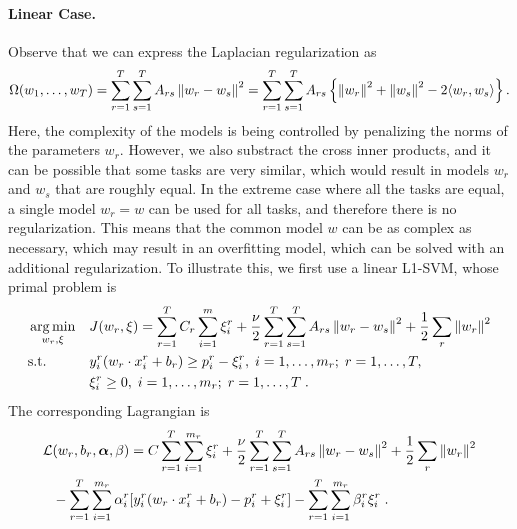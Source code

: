 \paragraph*{Linear Case.\\}
Observe that we can express the Laplacian regularization as
\begin{equation}
    \nonumber
    \Omega(w_1, \ldots, w_T) = \sum_{r=1}^T \sum_{s=1}^T A_{rs} \left\lVert w_r - w_s\right\rVert^2 =  \sum_{r=1}^T \sum_{s=1}^T A_{rs} \left\{ \left\lVert w_r\right\rVert^2 + \left\lVert w_s\right\rVert^2 - 2 \langle w_r, w_s \rangle \right\}.
\end{equation}
Here, the complexity of the models is being controlled by penalizing the norms of the parameters $w_r$. However, we also substract the cross inner products, and it can be possible that some tasks are very similar, which would result in models $w_r$ and $w_s$ that are roughly equal. In the extreme case where all the tasks are equal, a single model $w_r = w$ can be used for all tasks, and therefore there is no regularization. This means that the common model $w$ can be as complex as necessary, which may result in an overfitting model, which can be solved with an additional regularization.
To illustrate this, we first use a linear L1-SVM, whose primal problem is
\begin{equation}\label{eq:linear_gl_primal}
\begin{aligned}
& \argmin_{w_r, \xi}
& & {J(w_r, \xi) =  \sum_{r=1}^T C_r \sum_{i=1}^m{\xi_{i}^r} + \frac{\nu}{2} \sum_{r=1}^T \sum_{s=1}^T A_{rs} \norm{w_r - w_s}^2 + \frac{1}{2} \sum_r \norm{w_r}^2 }\\
& \text{s.t.}
& & y_{i}^r ( w_r \cdot x_{i}^r + b_r) \geq p_{i}^r - \xi_{i}^r , \;  i=1,\ldots,m_r; \;  r=1,\ldots,T,\\
& & & \xi_{i}^r \geq 0, \;  i=1,\ldots,m_r; \;  r=1,\ldots,T \; .
\end{aligned}
\end{equation}
The corresponding Lagrangian is
\begin{equation}\label{eq:svmmtl_lagr_GL_addreg}
\begin{aligned}
        \mathcal{L}&(w_r, b_r, \fv{\alpha}, \beta) = C \sum_{r=1}^T \sum_{i=1}^{m_r}{\xi_{i}^r} + \frac{\nu}{2} \sum_{r=1}^T \sum_{s=1}^T A_{rs} \norm{w_r - w_s}^2 + \frac{1}{2} \sum_r \norm{w_r}^2 \\
        & - \sum_{r=1}^T \sum_{i=1}^{m_r}{ \alpha_i^r [y_{i}^r (w_r \cdot x_{i}^r + b_r) - p_{i}^r + \xi_{i}^r]   } - \sum_{r=1}^T \sum_{i=1}^{m_r}{ \beta_i^r \xi_i^r } \; .
\end{aligned}
\end{equation}
